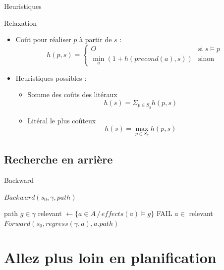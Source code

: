 \documentclass[compress]{beamer}
\begin{document}
\begin{frame}{Heuristiques}
\begin{block}{Relaxation}
	\begin{itemize}
	\item Coût pour réaliser $p$ à partir de $s$ :
	$$h(p,s) = \left\{\begin{array}{ll}
		O & \mbox{si } s \models p\\
		\min_a (1 + h(precond(a), s)) & \mbox{sinon}
		\end{array}\right.$$
	\item Heuristiques possibles :
		\begin{itemize}
		\item Somme des coûts des litéraux
		$$h(s) = \Sigma_{p \in S_g} h(p,s)$$
		\item Litéral le plus coûteux
		$$h(s) = \max_{p \in S_g} h(p,s)$$
		\end{itemize}
	\end{itemize}
\end{block}
\end{frame}

\subsection{Recherche en arrière}
\begin{frame}{Backward}
\begin{block}{$Backward(s_0, \gamma, path)$}
	\begin{algorithmic}
		\RETURN path
	\ELSE
		\STATE {} $g \in \gamma$
		\STATE relevant $\leftarrow \{a \in A \, / \, effects(a) \models g\}$
			\RETURN FAIL
		\ELSE
			\STATE {} $a \in$ relevant
			\RETURN $Forward(s_0, regress(\gamma, a), a.path)$
		\ENDIF
	\ENDIF
	\end{algorithmic}
\end{block}
\end{frame}

\section{Allez plus loin en planification}
\begin{frame}
\tableofcontents[hideothersubsections]
\end{frame}
\end{document}
